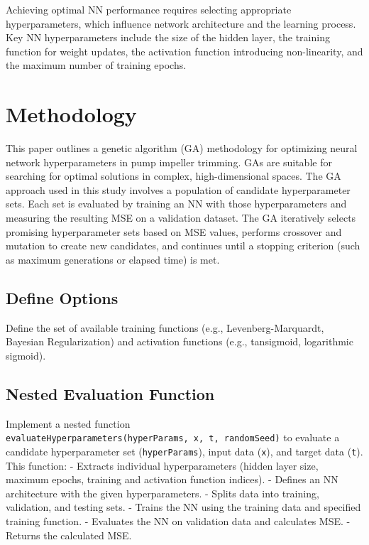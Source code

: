 \documentclass[
]{agujournal2019}
\begin{document}
Achieving optimal NN performance requires selecting appropriate
hyperparameters, which influence network architecture and the learning
process. Key NN hyperparameters include the size of the hidden layer,
the training function for weight updates, the activation function
introducing non-linearity, and the maximum number of training epochs.

\section{Methodology}\label{methodology}

This paper outlines a genetic algorithm (GA) methodology for optimizing
neural network hyperparameters in pump impeller trimming. GAs are
suitable for searching for optimal solutions in complex,
high-dimensional spaces. The GA approach used in this study involves a
population of candidate hyperparameter sets. Each set is evaluated by
training an NN with those hyperparameters and measuring the resulting
MSE on a validation dataset. The GA iteratively selects promising
hyperparameter sets based on MSE values, performs crossover and mutation
to create new candidates, and continues until a stopping criterion (such
as maximum generations or elapsed time) is met.

\subsection{Define Options}\label{define-options}

Define the set of available training functions (e.g.,
Levenberg-Marquardt, Bayesian Regularization) and activation functions
(e.g., tansigmoid, logarithmic sigmoid).

\subsection{Nested Evaluation
Function}\label{nested-evaluation-function}

Implement a nested function
\texttt{evaluateHyperparameters(hyperParams,\ x,\ t,\ randomSeed)} to
evaluate a candidate hyperparameter set (\texttt{hyperParams}), input
data (\texttt{x}), and target data (\texttt{t}). This function: -
Extracts individual hyperparameters (hidden layer size, maximum epochs,
training and activation function indices). - Defines an NN architecture
with the given hyperparameters. - Splits data into training, validation,
and testing sets. - Trains the NN using the training data and specified
training function. - Evaluates the NN on validation data and calculates
MSE. - Returns the calculated MSE.
\end{document}
